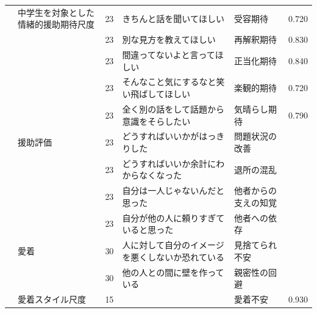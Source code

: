 \begin{landscape}
\begin{longtable}{p{2cm}p{2cm}p{2cm}p{6cm}p{2cm}p{2cm}}
                                 & 中学生を対象とした情緒的援助期待尺度               & 23  & きちんと話を聞いてほしい                                        & 受容期待                 & 0.720   \\
                                 &                                  & 23  & 別な見方を教えてほしい                                         & 再解釈期待                & 0.830   \\
                                 &                                  & 23  & 間違ってないよと言ってほしい                                      & 正当化期待                & 0.840   \\
                                 &                                  & 23  & そんなこと気にするなと笑い飛ばしてほしい                                & 楽観的期待                & 0.720   \\
                                 &                                  & 23  & 全く別の話をして話題から意識をそらしたい                                & 気晴らし期待               & 0.790   \\
                                 & 援助評価                             & 23  & どうすればいいかがはっきりした                                     & 問題状況の改善              &         \\
                                 &                                  & 23  & どうすればいいか余計にわからなくなった                                 & 退所の混乱                &         \\
                                 &                                  & 23  & 自分は一人じゃないんだと思った                                     & 他者からの支えの知覚           &         \\
                                 &                                  & 23  & 自分が他の人に頼りすぎていると思った                                  & 他者への依存               &         \\
                                 & 愛着                               & 30  & 人に対して自分のイメージを悪くしないか恐れている                            & 見捨てられ不安              &         \\
                                 &                                  & 30  & 他の人との間に壁を作っている                                      & 親密性の回避               &         \\
        \citet{Kanemasa202192}   & 愛着スタイル尺度                         & 15  &                                                     & 愛着不安                 & 0.930   \\

\end{longtable}
\end{landscape}
